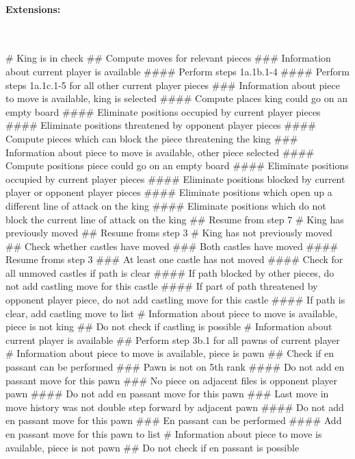 \documentclass{article}
\begin{document}
\paragraph{Extensions:}\mbox{}\\
\begin{easylist}[enumerate]
# King is in check
## Compute moves for relevant pieces
### Information about current player is available
#### Perform steps 1a.1b.1-4
#### Perform steps 1a.1c.1-5 for all other current player pieces
### Information about piece to move is available, king is selected
#### Compute places king could go on an empty board
#### Eliminate positions occupied by current player pieces
#### Eliminate positions threatened by opponent player pieces
#### Compute pieces which can block the piece threatening the king
### Information about piece to move is available, other piece selected
#### Compute positions piece could go on an empty board
#### Eliminate positions occupied by current player pieces
#### Eliminate positions blocked by current player or opponent player pieces
#### Eliminate positions which open up a different line of attack on the king
#### Eliminate positions which do not block the current line of attack on the king
## Resume from step 7
# King has previously moved
## Resume froms step 3
# King has not previously moved
## Check whether castles have moved
### Both castles have moved
#### Resume froms step 3
### At least one castle has not moved
#### Check for all unmoved castles if path is clear
#### If path blocked by other pieces, do not add castling move for this castle
#### If part of path threatened by opponent player piece, do not add castling move for this castle
#### If path is clear, add castling move to list
# Information about piece to move is available, piece is not king
## Do not check if castling is possible
# Information about current player is available
## Perform step 3b.1 for all pawns of current player
# Information about piece to move is available, piece is pawn
## Check if en passant can be performed
### Pawn is not on 5th rank
#### Do not add en passant move for this pawn
### No piece on adjacent files is opponent player pawn
#### Do not add en passant move for this pawn
### Last move in move history was not double step forward by adjacent pawn
#### Do not add en passant move for this pawn
### En passant can be performed
#### Add en passant move for this pawn to list
# Information about piece to move is available, piece is not pawn
## Do not check if en passant is possible
\end{easylist}
\end{document}
